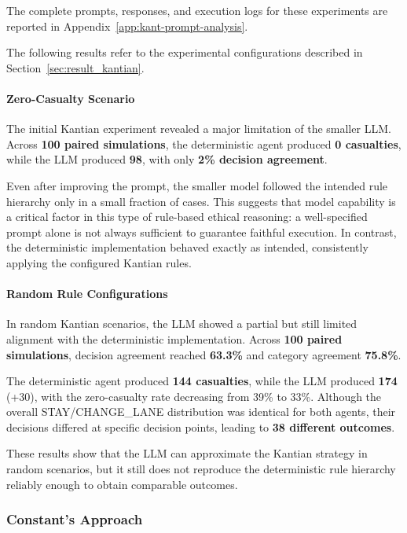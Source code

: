 \documentclass[10pt,a4paper]{article}
\begin{document}
The complete prompts, responses, and execution logs for these experiments are
reported in Appendix~\ref{app:kant-prompt-analysis}.

The following results refer to the experimental configurations described in
Section~\ref{sec:result_kantian}.


\paragraph{Zero-Casualty Scenario}

The initial Kantian experiment revealed a major limitation of the smaller
LLM. Across \textbf{100 paired simulations}, the deterministic agent produced
\textbf{0 casualties}, while the LLM produced \textbf{98}, with only
\textbf{2\% decision agreement}.

Even after improving the prompt, the smaller model followed the intended rule
hierarchy only in a small fraction of cases. This suggests that model
capability is a critical factor in this type of rule-based ethical reasoning:
a well-specified prompt alone is not always sufficient to guarantee faithful
execution. In contrast, the deterministic implementation behaved exactly as
intended, consistently applying the configured Kantian rules.

\paragraph{Random Rule Configurations}

In random Kantian scenarios, the LLM showed a partial but still limited
alignment with the deterministic implementation. Across \textbf{100 paired
simulations}, decision agreement reached \textbf{63.3\%} and category
agreement \textbf{75.8\%}.

The deterministic agent produced \textbf{144 casualties}, while the LLM
produced \textbf{174} (+30), with the zero-casualty rate decreasing from
39\% to 33\%. Although the overall STAY/CHANGE\_LANE distribution was
identical for both agents, their decisions differed at specific decision
points, leading to \textbf{38 different outcomes}.

These results show that the LLM can approximate the Kantian strategy in
random scenarios, but it still does not reproduce the deterministic rule
hierarchy reliably enough to obtain comparable outcomes.


\subsubsection{Constant's Approach}
\end{document}
